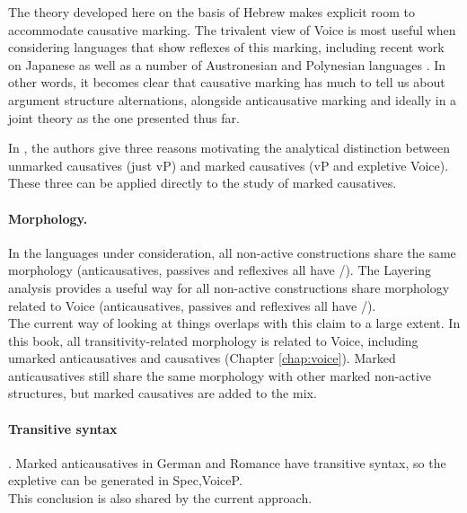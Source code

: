 The theory developed here on the basis of Hebrew makes explicit room to accommodate causative marking. The trivalent view of Voice is most useful when considering languages that show reflexes of this marking, including recent work on Japanese \citep{oseki17nyu} as well as a number of Austronesian and Polynesian languages \citep{nie17}. In other words, it becomes clear that causative marking has much to tell us about argument structure alternations, alongside anticausative marking and ideally in a joint theory as the one presented thus far.

In \citet[99--100]{layering15}, the authors give three reasons motivating the analytical distinction between unmarked causatives (just vP) and marked causatives (vP and expletive Voice). These three can be applied directly to the study of marked causatives.

\paragraph*{Morphology.} In the languages under consideration, all non-active constructions share the same morphology (anticausatives, passives and reflexives all have /). The Layering analysis provides a useful way for all non-active constructions share morphology related to Voice (anticausatives, passives and reflexives all have /).\\
	The current way of looking at things overlaps with this claim to a large extent. In this book, all transitivity-related morphology is related to Voice, including umarked anticausatives and causatives (Chapter \ref{chap:voice}). Marked anticausatives still share the same morphology with other marked non-active structures, but marked causatives are added to the mix.

\paragraph*{Transitive syntax}. Marked anticausatives in German and Romance have transitive syntax, so the expletive can be generated in Spec,VoiceP.\\
	This conclusion is also shared by the current approach.
	
